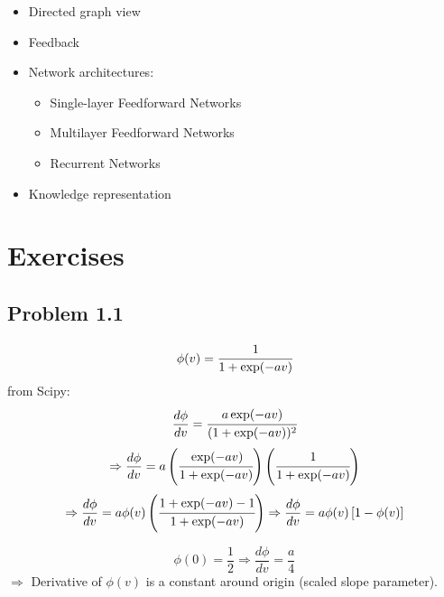 \documentclass[paper=a4, fontsize=11pt]{scrartcl} %
\begin{document}
\begin{itemize}
        \item Directed graph view

        \item Feedback

        \item Network architectures:
        \begin{itemize}
            \item Single-layer Feedforward Networks
            \item Multilayer Feedforward Networks
            \item Recurrent Networks
        \end{itemize}

        \item Knowledge representation
    \end{itemize}

    \section*{Exercises}

    \subsection*{Problem 1.1}
    \[ \phi(v) = \cfrac{1}{1 + \exp(-av)} \]
    from Scipy:
    \[ \frac{d\phi}{dv} = \cfrac{a \exp(-av)}{(1 + \exp(-av))^2} \]
    \[ \Rightarrow \frac{d\phi}{dv} = a \left(\cfrac{\exp(-av)}{1 + \exp(-av)}\right) \left(\cfrac{1}{1 + \exp(-av)}\right)\]
    \[
    \Rightarrow \frac{d\phi}{dv} = a \phi(v) \left(\cfrac{1 + \exp(-av) - 1}{1 + \exp(-av)}\right)
    \Rightarrow \frac{d\phi}{dv} = a \phi(v) \left[ 1- \phi(v) \right]\]

    \[ \phi(0) = \frac{1}{2} \Rightarrow \frac{d\phi}{dv} = \frac{a}{4} \]
    $\Rightarrow$ Derivative of $\phi(v)$ is a constant around origin (scaled slope parameter).
\end{document}
